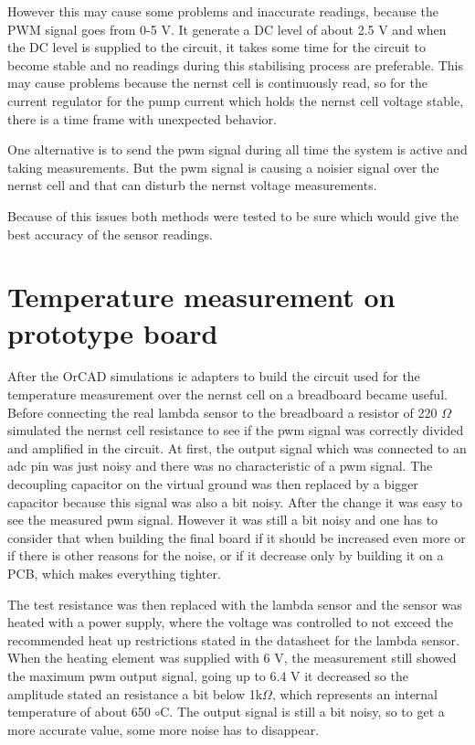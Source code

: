 However this may cause some problems and inaccurate readings, because the PWM signal goes from 0-5 V. It generate a DC level of about 2.5 V and when the DC level is supplied to the circuit, it takes some time for the circuit to become stable and  no readings during this stabilising process are preferable. This may cause problems because the nernst cell is continuously read, so for the current regulator for the pump current which holds the nernst cell voltage stable, there is a time frame with unexpected behavior.


One alternative is to send the \ac{pwm} signal during all time the system is active and taking measurements. But the \ac{pwm} signal is causing a noisier signal over the nernst cell and that can disturb the nernst voltage measurements.


Because of this issues both methods were tested to be sure which would give the best accuracy of the sensor readings.


\section{Temperature measurement on prototype board}

After the OrCAD simulations \ac{ic} adapters to build the circuit used for the temperature measurement over the nernst cell on a breadboard became useful. Before connecting the real lambda sensor to the breadboard a resistor of 220 $\Omega$ simulated the nernst cell resistance to see if the \ac{pwm} signal was correctly divided and amplified in the circuit. At first, the output signal which was connected to an \ac{adc} pin was just noisy and there was no characteristic of a \ac{pwm} signal. The decoupling capacitor on the virtual ground was then replaced by a bigger capacitor because this signal was also a bit noisy. After the change it was easy to see the measured \ac{pwm} signal. However it was still a bit noisy and one has to consider that when building the final board if it should be increased even more or if there is other reasons for the noise, or if it decrease only by building it on a PCB, which makes everything tighter.

The test resistance was then replaced with the lambda sensor and the sensor was heated with a power supply, where the voltage was controlled to not exceed the recommended heat up restrictions stated in the datasheet for the lambda sensor. When the heating element was supplied with 6 V, the measurement still showed the maximum \ac{pwm} output signal, going up to 6.4 V it decreased so the amplitude stated an resistance a bit below 1k$\Omega$, which represents an internal temperature of about 650 $\circ$C. The output signal is still a bit noisy, so to get a more accurate value, some more noise has to disappear.


